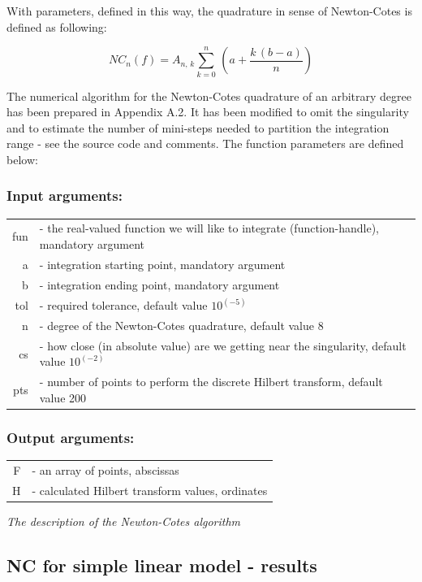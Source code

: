 \documentclass[12pt,twoside,a4paper]{article}
\numberwithin{equation}{subsection}
\numberwithin{figure}{subsection}
\begin{document}
With parameters, defined in this way, the quadrature in sense of Newton-Cotes is defined as following:

\begin{equation} \label{eq:nc_mainequation}
   {NC_{n}}(f)={A_{n, \,k}}\sum_{k=0}^{n}\, (a + \frac {k\,(b - a)}{n}) 
\end{equation}

The numerical algorithm for the Newton-Cotes quadrature of an arbitrary degree has been prepared in Appendix A.2. It has been
modified to omit the singularity and to estimate the number of mini-steps needed to partition the integration range - see the
source code and comments. The function parameters are defined below:

\subsubsection*{Input arguments: }

\begin{tabular}{r l}
  fun & - the real-valued function we will like to integrate (function-handle), mandatory argument \\
  a & - integration starting point, mandatory argument \\
  b & - integration ending point, mandatory argument \\
  tol & - required tolerance, default value $10^{( - 5)}$ \\
  n & - degree of the Newton-Cotes quadrature, default value 8 \\
  cs & - how close (in absolute value) are we getting near the singularity, default value $10^{( - 2)}$ \\
  pts & - number of points to perform the discrete Hilbert transform, default value 200 \\
\end{tabular}


\subsubsection*{Output arguments:}
\begin{tabular}{r l}
  F & - an array of points, abscissas \\
  H & - calculated Hilbert transform values, ordinates \\
\end{tabular}

\textit{The description of the Newton-Cotes algorithm}

\subsection{NC for simple linear model - results} \label{chap:nc_lin}
\end{document}
